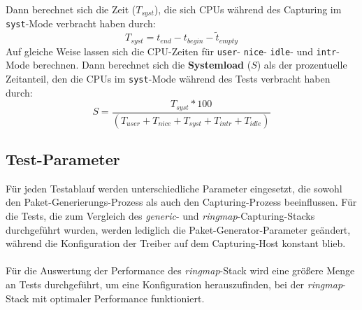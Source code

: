 {%
Dann berechnet sich die Zeit (\begin{math}T_{syst}\end{math}), 
die sich CPUs während des Capturing im 
\verb+syst+-Mode verbracht haben durch: 
\begin{equation}
	T_{syst} = t_{end} - t_{begin} - \tilde{t}_{empty}
\end{equation}
Auf gleiche Weise lassen sich die CPU-Zeiten für \verb+user+- \verb+nice+- \verb+idle+- und \verb+intr+-Mode
berechnen. Dann berechnet sich die \textbf{Systemload} ($S$) als der prozentuelle Zeitanteil,
den die CPUs im \verb+syst+-Mode während des Tests verbracht haben 
durch:
\begin{equation}
	S = \frac{T_{syst} * 100}{(T_{user} + T_{nice} + T_{syst} + T_{intr} + T_{idle})}
\end{equation}

\subsection{Test-Parameter}\label{sec:test_params}
Für jeden Testablauf werden unterschiedliche Parameter eingesetzt, die sowohl
den Paket-Generierungs-Prozess als auch den Capturing-Prozess beeinflussen. Für
die Tests, die zum Vergleich des \emph{generic}- und \emph{ringmap}-Capturing-Stacks durchgeführt
wurden, werden lediglich die Paket-Generator-Parameter geändert, während die
Konfiguration der Treiber auf dem Capturing-Host konstant blieb.\\\\
Für die Auswertung der Performance des \emph{ringmap}-Stack wird eine größere 
Menge an Tests durchgeführt, um eine Konfiguration herauszufinden, bei der 
\emph{ringmap}-Stack mit optimaler Performance funktioniert.

}
